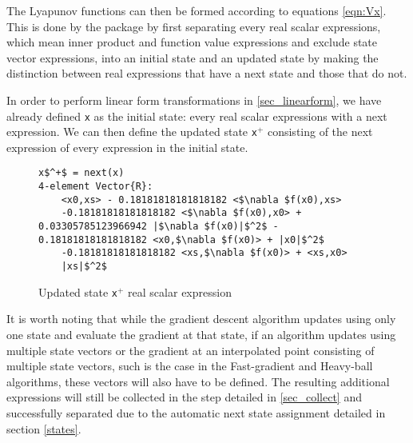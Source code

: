 The Lyapunov functions can then be formed according to equations \eqref{eqn:Vx}. This is done by the package by first separating every real scalar expressions, which mean inner product and function value expressions and exclude state vector expressions, into an initial state and an updated state by making the distinction between real expressions that have a next state and those that do not.

In order to perform linear form transformations in \cref{sec_linearform}, we have already defined \texttt{x} as the initial state: every real scalar expressions with a next expression. We can then define the updated state \texttt{x$^+$} consisting of the next expression of every expression in the initial state. 

\begin{figure}[h!]
    \begin{lstlisting}[mathescape]
x$^+$ = next(x)
4-element Vector{R}:
    <x0,xs> - 0.18181818181818182 <$\nabla $f(x0),xs>
    -0.18181818181818182 <$\nabla $f(x0),x0> + 0.03305785123966942 |$\nabla $f(x0)|$^2$ - 0.18181818181818182 <x0,$\nabla $f(x0)> + |x0|$^2$
    -0.18181818181818182 <xs,$\nabla $f(x0)> + <xs,x0>
    |xs|$^2$
\end{lstlisting}
\caption{Updated state \texttt{x$^+$} real scalar expression}
\label{ex_nextstate}
\end{figure}

It is worth noting that while the gradient descent algorithm updates using only one state and evaluate the gradient at that state, if an algorithm updates using multiple state vectors or the gradient at an interpolated point consisting of multiple state vectors, such is the case in the Fast-gradient and Heavy-ball algorithms, these vectors will also have to be defined. The resulting additional expressions will still be collected in the step detailed in \cref{sec_collect} and successfully separated due to the automatic next state assignment detailed in section \cref{states}.

